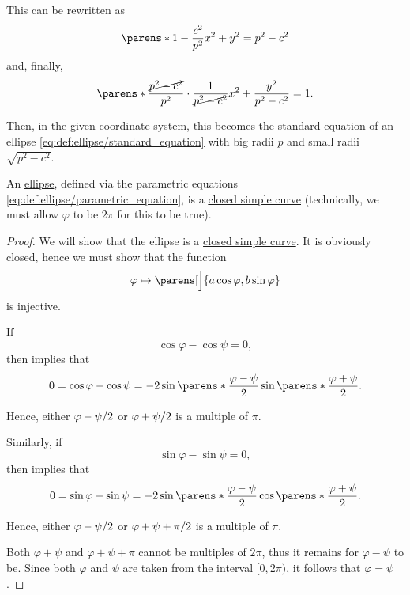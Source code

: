 \begin{defproof}
  This can be rewritten as
  \begin{equation*}
    \parens*{ 1 - \frac {c^2} {p^2} } x^2 + y^2 = p^2 - c^2
  \end{equation*}
  and, finally,
  \begin{equation*}
    \parens*{ \frac {\cancel{p^2 - c^2}} {p^2} \cdot \frac 1 {\cancel{p^2 - c^2}} } x^2 + \frac {y^2} {p^2 - c^2} = 1.
  \end{equation*}

  Then, in the given coordinate system, this becomes the standard equation of an ellipse \eqref{eq:def:ellipse/standard_equation} with big radii \( p \) and small radii \( \sqrt{p^2 - c^2} \).
\end{defproof}

\begin{proposition}\label{thm:ellipse_is_closed_simple_curve}
  An \hyperref[def:ellipse]{ellipse}, defined via the parametric equations \eqref{eq:def:ellipse/parametric_equation}, is a \hyperref[def:simple_curve]{closed simple curve} (technically, we must allow \( \varphi \) to be \( 2\pi \) for this to be true).
\end{proposition}
\begin{proof}
  We will show that the ellipse is a \hyperref[def:simple_curve]{closed simple curve}. It is obviously closed, hence we must show that the function
  \begin{equation*}
    \varphi \mapsto \parens[\Big]{ a \cos \varphi, b \sin \varphi }
  \end{equation*}
  is injective.

  If
  \begin{equation*}
    \cos \varphi - \cos \psi = 0,
  \end{equation*}
  then  implies that
  \begin{equation*}
    0
    =
    \cos \varphi - \cos \psi
    =
    -2 \sin\parens*{ \frac{\varphi - \psi} 2 } \sin\parens*{ \frac{\varphi + \psi} 2 }.
  \end{equation*}

  Hence, either \( \ifrac {\varphi - \psi} 2 \) or \( \ifrac {\varphi + \psi} 2 \) is a multiple of \( \pi \).

  Similarly, if
  \begin{equation*}
    \sin \varphi - \sin \psi = 0,
  \end{equation*}
  then  implies that
  \begin{equation*}
    0
    =
    \sin \varphi - \sin \psi
    =
    -2 \sin\parens*{ \frac{\varphi - \psi} 2 } \cos\parens*{ \frac{\varphi + \psi} 2 }.
  \end{equation*}

  Hence, either \( \ifrac {\varphi - \psi} 2 \) or \( \ifrac {\varphi + \psi + \pi} 2 \) is a multiple of \( \pi \).

  Both \( \varphi + \psi \) and \( \varphi + \psi + \pi \) cannot be multiples of \( 2\pi \),  thus it remains for \( \varphi - \psi \) to be. Since both \( \varphi \) and \( \psi \) are taken from the interval \( [0, 2\pi) \), it follows that \( \varphi = \psi \).
\end{proof}

